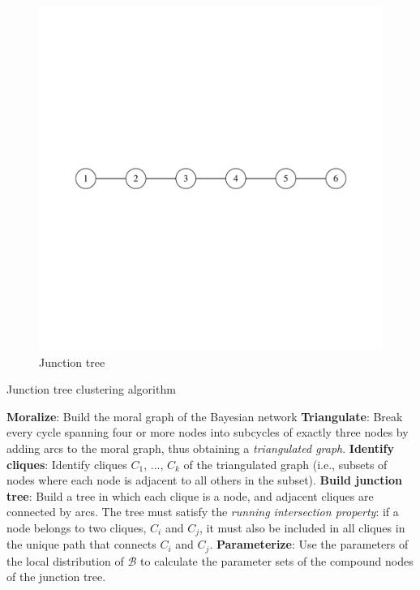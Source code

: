 \begin{figure}
  \centering
  \includegraphics[trim={1.5cm 8.2cm 1.5cm 8.2cm}, width=\textwidth]{figures/junction-tree.pdf}
  \caption{Junction tree}
  \label{fig:junction-tree}
\end{figure}

\vspace{+0.6cm}
\begin{algorithm}[htbp]
  \centering
  \caption{Junction tree clustering algorithm \cite{scutari}}
  \label{alg:junction-tree}
  \begin{algorithmic}
    \STATE \textbf{Moralize}: Build the moral graph of the Bayesian network %
    \STATE \textbf{Triangulate}: Break every cycle spanning four or more nodes into subcycles of exactly three nodes by adding arcs to the moral graph, thus obtaining a \textit{triangulated graph}.
    \STATE \textbf{Identify cliques}: Identify cliques $C_{1}$, ..., $C_{k}$ of the triangulated graph (i.e., subsets of nodes where each node is adjacent to all others in the subset).
    \STATE \textbf{Build junction tree}: Build a tree in which each clique is a node, and adjacent cliques are connected by arcs. The tree must satisfy the \textit{running intersection property}: if a node belongs to two cliques, $C_{i}$ and $C_{j}$, it must also be included in all cliques in the unique path that connects $C_{i}$ and $C_{j}$.
    \STATE \textbf{Parameterize}: Use the parameters of the local distribution of $\mathcal{B}$ to calculate the parameter sets of the compound nodes of the junction tree.
  \end{algorithmic}
\end{algorithm}


